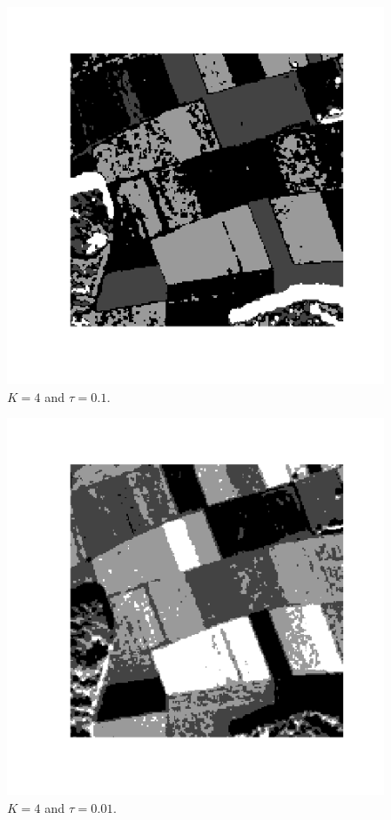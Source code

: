 \documentclass[twoside]{Homework}
\begin{document}
\begin{figure}[!ht]
  \centering
    \includegraphics[scale=0.6]{4-01.png}
  \caption{$K=4$ and $\tau=0.1$.}
\end{figure}
\begin{figure}[!ht]
  \centering
    \includegraphics[scale=0.6]{4-001.png}
  \caption{$K=4$ and $\tau=0.01$.}
\end{figure}
\end{document}
